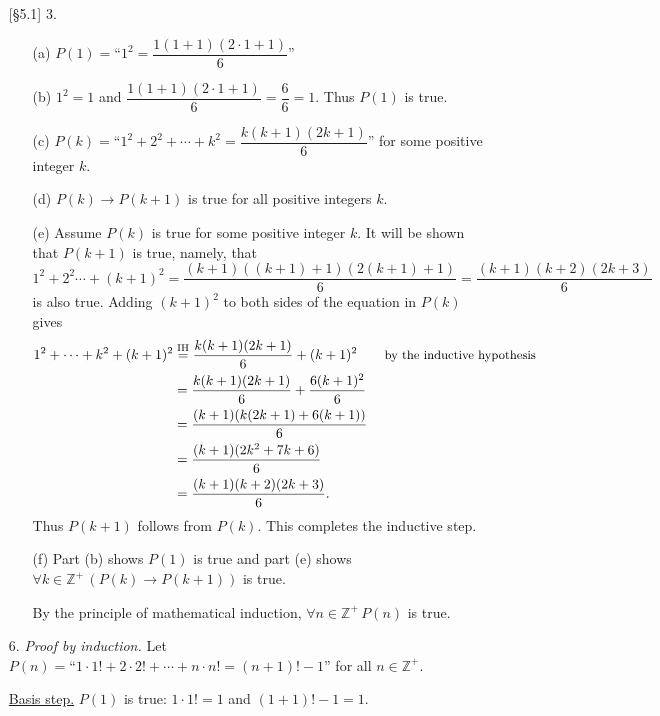 \documentclass{article}
\begin{document}
\begin{enumerate}
    \item[{[\S 5.1]} 3.]
        \begin{itemize}
            \item[(a)] $P(1) = \text{``}1^2 = \dfrac{1(1+1)(2\cdot 1 + 1)}{6}\text{''}$
            \item[(b)] $1^2 = 1$ and $\dfrac{1(1+1)(2\cdot 1 + 1)}{6} = \dfrac{6}{6} = 1$. Thus $P(1)$ is true.
            \item[(c)] $P(k) = \text{``}1^2 + 2^2 + \cdots + k^2 = \dfrac{k(k+1)(2k+1)}{6}\text{''}$ for some positive integer $k$.
            \item[(d)] $P(k) \rightarrow P(k+1)$ is true for all positive integers $k$.
            \item[(e)] Assume $P(k)$ is true for some positive integer $k$. It will be shown that $P(k+1)$ is true, namely, that
            \[
            1^2 + 2^2 \cdots + (k+1)^2 = \frac{(k+1)((k+1)+1)(2(k+1)+1)}{6} = \frac{(k+1)(k+2)(2k+3)}{6}
            \]
            is also true. Adding $(k+1)^2$ to both sides of the equation in $P(k)$ gives
            \begin{align*}
            1^2 + \cdots + k^2 + (k+1)^2 &\overset{\mathrm{IH}}{=} \frac{k(k+1)(2k+1)}{6} + (k+1)^2 \tag*{\small{by the inductive hypothesis}}\\
            &= \frac{k(k+1)(2k+1)}{6} + \frac{6(k+1)^2}{6}\\
            &= \frac{(k+1)(k(2k+1)+6(k+1))}{6}\\
            &= \frac{(k+1)(2k^2+7k+6)}{6}\\
            &= \frac{(k+1)(k+2)(2k+3)}{6}.
            \end{align*}
            Thus $P(k+1)$ follows from $P(k)$. This completes the inductive step.
            \item[(f)] Part (b) shows $P(1)$ is true and part (e) shows $\forall k \in \mathbb{Z}^+ \, \left( P(k) \rightarrow P(k+1) \right)$ is true.

            By the principle of mathematical induction, $\forall n \in \mathbb{Z}^+ \, P(n)$ is true.
        \end{itemize}
    \item[6.] \textit{Proof by induction.} Let $P(n) = \text{``}1 \cdot 1! + 2 \cdot 2! + \cdots + n \cdot n! = (n+1)!-1\text{''}$ for all $n \in \mathbb{Z}^+$.

    \underline{Basis step.} $P(1)$ is true: $1 \cdot 1! = 1$ and $(1+1)!-1 = 1$.


\end{enumerate}
\end{document}

